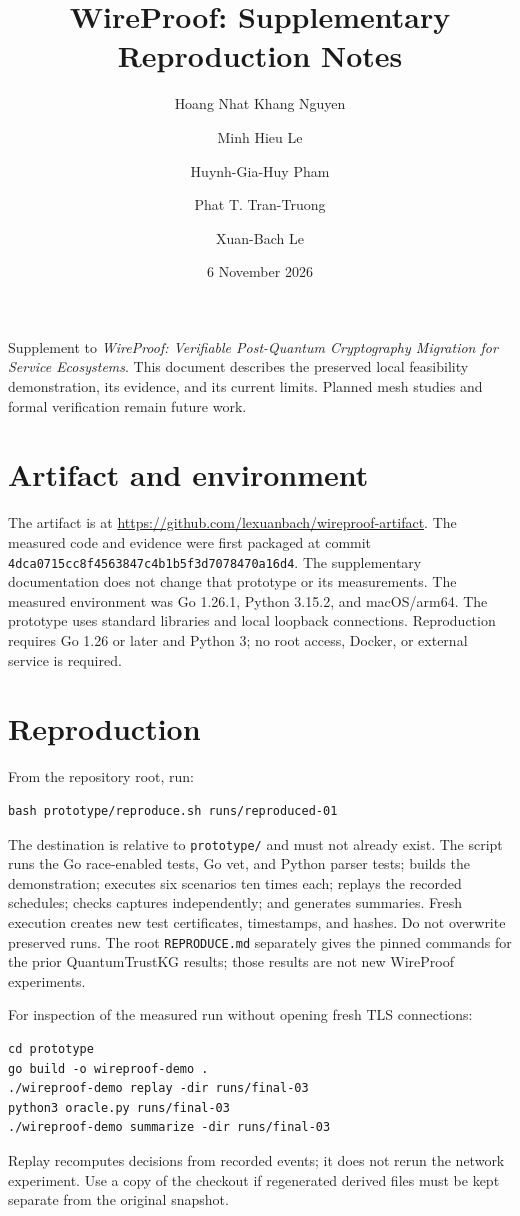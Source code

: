 \documentclass[10pt,a4paper]{article}
\title{WireProof: Supplementary Reproduction Notes}
\author{Hoang Nhat Khang Nguyen \and Minh Hieu Le \and Huynh-Gia-Huy Pham \and Phat T. Tran-Truong \and Xuan-Bach Le}
\date{6 November 2026}
\begin{document}
\maketitle
\noindent Supplement to \emph{WireProof: Verifiable Post-Quantum Cryptography Migration for Service Ecosystems}. This document describes the preserved local feasibility demonstration, its evidence, and its current limits. Planned mesh studies and formal verification remain future work.

\section{Artifact and environment}
The artifact is at \url{https://github.com/lexuanbach/wireproof-artifact}.
The measured code and evidence were first packaged at commit \texttt{4dca0715cc8f4563847c4b1b5f3d7078470a16d4}. The supplementary documentation does not change that prototype or its measurements. The measured environment was Go 1.26.1, Python 3.15.2, and macOS/arm64. The prototype uses standard libraries and local loopback connections. Reproduction requires Go 1.26 or later and Python 3; no root access, Docker, or external service is required.

\section{Reproduction}
From the repository root, run:
\begin{verbatim}
bash prototype/reproduce.sh runs/reproduced-01
\end{verbatim}
The destination is relative to \texttt{prototype/} and must not already exist. The script runs the Go race-enabled tests, Go vet, and Python parser tests; builds the demonstration; executes six scenarios ten times each; replays the recorded schedules; checks captures independently; and generates summaries. Fresh execution creates new test certificates, timestamps, and hashes. Do not overwrite preserved runs. The root \texttt{REPRODUCE.md} separately gives the pinned commands for the prior QuantumTrustKG results; those results are not new WireProof experiments.

For inspection of the measured run without opening fresh TLS connections:
\begin{verbatim}
cd prototype
go build -o wireproof-demo .
./wireproof-demo replay -dir runs/final-03
python3 oracle.py runs/final-03
./wireproof-demo summarize -dir runs/final-03
\end{verbatim}
Replay recomputes decisions from recorded events; it does not rerun the network experiment. Use a copy of the checkout if regenerated derived files must be kept separate from the original snapshot.
\end{document}

